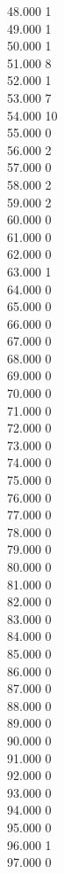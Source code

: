 { 48.000	1 \\
 49.000	1 \\
 50.000	1 \\
 51.000	8 \\
 52.000	1 \\
 53.000	7 \\
 54.000	10 \\
 55.000	0 \\
 56.000	2 \\
 57.000	0 \\
 58.000	2 \\
 59.000	2 \\
 60.000	0 \\
 61.000	0 \\
 62.000	0 \\
 63.000	1 \\
 64.000	0 \\
 65.000	0 \\
 66.000	0 \\
 67.000	0 \\
 68.000	0 \\
 69.000	0 \\
 70.000	0 \\
 71.000	0 \\
 72.000	0 \\
 73.000	0 \\
 74.000	0 \\
 75.000	0 \\
 76.000	0 \\
 77.000	0 \\
 78.000	0 \\
 79.000	0 \\
 80.000	0 \\
 81.000	0 \\
 82.000	0 \\
 83.000	0 \\
 84.000	0 \\
 85.000	0 \\
 86.000	0 \\
 87.000	0 \\
 88.000	0 \\
 89.000	0 \\
 90.000	0 \\
 91.000	0 \\
 92.000	0 \\
 93.000	0 \\
 94.000	0 \\
 95.000	0 \\
 96.000	1 \\
 97.000	0 \\
}
